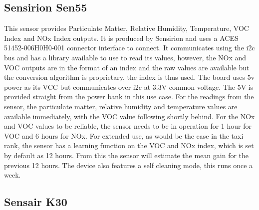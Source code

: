 \subsection{Sensirion Sen55}
This sensor provides Particulate Matter, Relative Humidity, Temperature, VOC Index and NOx Index outputs.
It is produced by Sensirion and uses a ACES 51452-006H0H0-001 connector interface to connect. It communicates using the i2c bus and has a library available to use to read its values, however, the NOx and VOC outputs are in the format of an index and the raw values are available but the conversion algorithm is proprietary, the index is thus used. The board uses 5v power as its VCC but communicates over i2c at 3.3V common voltage. The 5V is provided straight from the power bank in this use case.
For the readings from the sensor, the particulate matter, relative humidity and temperature values are available immediately, with the VOC value following shortly behind. For the NOx and VOC values to be reliable, the sensor needs to be in operation for 1 hour for VOC and 6 hours for NOx. For extended use, as would be the case in the taxi rank, the sensor has a learning function on the VOC and NOx index, which is set by default as 12 hours. From this the sensor will estimate the mean gain for the previous 12 hours. The device also features a self cleaning mode, this runs once a week.
\subsection{Sensair K30}



%
%
%
%

